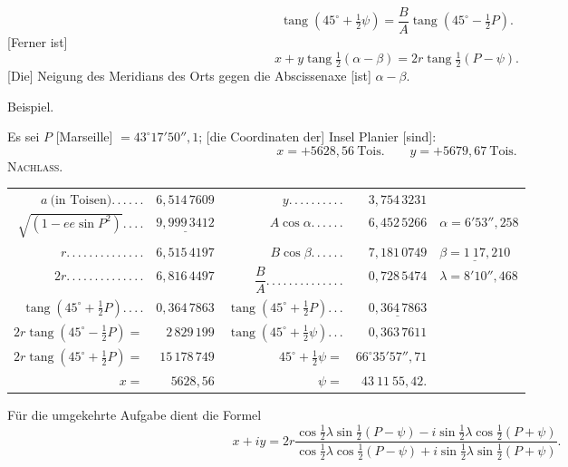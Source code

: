 \[
\operatorname{tang}(45^\circ+\tfrac12\psi)=\frac BA\operatorname{tang}(45^\circ-\tfrac12P).
\]
[Ferner ist]
\[
x+y\operatorname{tang}\tfrac12(\alpha-\beta)=2r\operatorname{tang}\tfrac12(P-\psi).
\]
[Die] Neigung des Meridians des Orts gegen die Abscissenaxe [ist] $\alpha-\beta$.
\begin{center}Beispiel.\end{center}
Es sei $P$ [Marseille] $=43^\circ17'50''{,}1$; [die Coordinaten der] Insel Planier [sind]:
\[
x=+5628{,}56\ \text{Tois.}\qquad y=+5679{,}67\ \text{Tois.}
\]
\clearpage
{}\hfill\textsc{Nachlass.}\hfill\mbox{}\par{}
\begin{center}
\begingroup\fontsize{8}{12}\selectfont\setlength{\tabcolsep}{3pt}\renewcommand{\arraystretch}{1.4}
\begin{tabular}{@{}r@{ }r@{\quad}r@{ }r@{\quad}l@{}}
$a\ \text{(in Toisen)} .\,.\,.\,.\,.\,.$&$6{,}514\,7609$&$y.\,.\,.\,.\,.\,.\,.\,.\,.\,.$&$3{,}754\,3231$&\\
$\sqrt{(1-ee\sin P^2)}.\,.\,.\,.$&$\underline{9{,}999\,3412}$&$A\cos\alpha.\,.\,.\,.\,.\,.$&$6{,}452\,5266$&$\alpha=6'53''{,}258$\\
$r.\,.\,.\,.\,.\,.\,.\,.\,.\,.\,.\,.\,.\,.$&$6{,}515\,4197$&$B\cos\beta.\,.\,.\,.\,.\,.$&$7{,}181\,0749$&$\underline{\beta=1\ 17{,}210}$\\\cline{3-4}
$2r.\,.\,.\,.\,.\,.\,.\,.\,.\,.\,.\,.\,.\,.$&$6{,}816\,4497$&$\dfrac BA.\,.\,.\,.\,.\,.\,.\,.\,.\,.\,.\,.\,.\,.$&$0{,}728\,5474$&$\lambda=8'10''{,}468$\\
$\operatorname{tang}(45^\circ+\tfrac12P).\,.\,.\,.$&$0{,}364\,7863$&$\operatorname{tang}(45^\circ+\tfrac12P).\,.\,.$&$\underline{0{,}364\,7863}$&\\
$2r\operatorname{tang}(45^\circ-\tfrac12P)=$&$2\,829\,199$&$\operatorname{tang}(45^\circ+\tfrac12\psi).\,.\,.$&$0{,}363\,7611$&\\
$2r\operatorname{tang}(45^\circ+\tfrac12P)=$&$15\,178\,749$&$45^\circ+\tfrac12\psi=$&$66^\circ35'57''{,}71$&\\
$x=$&$5628{,}56$&$\psi=$&$43\ 11\ 55{,}42.$&
\end{tabular}\par\endgroup
\end{center}
Für die umgekehrte Aufgabe dient die Formel
\[
x+iy=2r\frac{\cos\frac12\lambda\sin\frac12(P-\psi)-i\sin\frac12\lambda\cos\frac12(P+\psi)}{\cos\frac12\lambda\cos\frac12(P-\psi)+i\sin\frac12\lambda\sin\frac12(P+\psi)}.
\]
